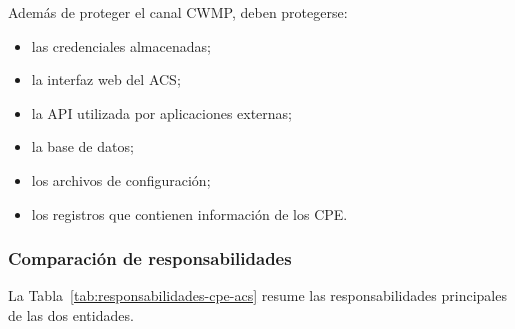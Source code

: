 Además de proteger el canal CWMP, deben protegerse:

\begin{itemize}
    \item las credenciales almacenadas;
    \item la interfaz web del ACS;
    \item la API utilizada por aplicaciones externas;
    \item la base de datos;
    \item los archivos de configuración;
    \item los registros que contienen información de los CPE.
\end{itemize}


\subsubsection*{Comparación de responsabilidades}

La Tabla~\ref{tab:responsabilidades-cpe-acs} resume las responsabilidades
principales de las dos entidades.

